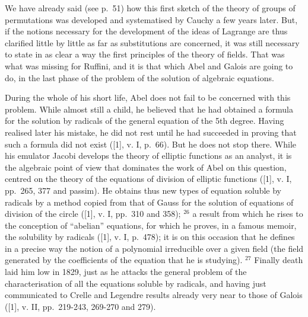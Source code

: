 We have already said (see p.~51) how this first sketch of the theory of groups of permutations was developed and systematised by Cauchy a few years later. But, if the notions necessary for the development of the ideas of Lagrange are thus clarified little by little as far as substitutions are concerned, it was still necessary to state in as clear a way the first principles of the theory of fields. That was what was missing for Ruffini, and it is that which Abel and Galois are going to do, in the last phase of the problem of the solution of algebraic equations.

During the whole of his short life, Abel does not fail to be concerned with this problem. While almost still a child, he believed that he had obtained a formula for the solution by radicals of the general equation of the 5th degree. Having realised later his mistake, he did not rest until he had succeeded in proving that such a formula did not exist ({[}1{]}, v. I, p.~66). But he does not stop there. While his emulator Jacobi develops the theory of elliptic functions as an analyst, it is the algebraic point of view that dominates the work of Abel on this question, centred on the theory of the equations of division of elliptic functions ({[}1{]}, v. I, pp.~265, 377 and passim). He obtains thus new types of equation soluble by radicals by a method copied from that of Gauss for the solution of equations of division of the circle ({[}1{]}, v. I, pp.~310 and 358); \(^{26}\) a result from which he rises to the conception of ``abelian'' equations, for which he proves, in a famous memoir, the solubility by radicals ({[}1{]}, v. I, p.~478); it is on this occasion that he defines in a precise way the notion of a polynomial irreducible over a given field (the field generated by the coefficients of the equation that he is studying). \(^{27}\) Finally death laid him low in 1829, just as he attacks the general problem of the characterisation of all the equations soluble by radicals, and having just communicated to Crelle and Legendre results already very near to those of Galois ({[}1{]}, v. II, pp.~219-243, 269-270 and 279).

